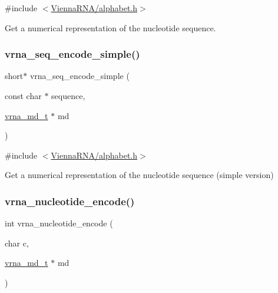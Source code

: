 {\ttfamily \#include $<$\mbox{\hyperlink{alphabet_8h}{Vienna\+R\+N\+A/alphabet.\+h}}$>$}



Get a numerical representation of the nucleotide sequence. 

\mbox{\label{group__alphabet__utils_ga3cd79d21d53248ad2634c1c0d43e97d7}} 
\subsubsection{\texorpdfstring{vrna\_seq\_encode\_simple()}{vrna\_seq\_encode\_simple()}}
{\footnotesize\ttfamily short$\ast$ vrna\+\_\+seq\+\_\+encode\+\_\+simple (\begin{DoxyParamCaption}\item[{const char $\ast$}]{sequence,  }\item[{\mbox{\hyperlink{group__model__details_ga1f8a10e12a0a1915f2a4eff0b28ea17c}{vrna\+\_\+md\+\_\+t}} $\ast$}]{md }\end{DoxyParamCaption})}



{\ttfamily \#include $<$\mbox{\hyperlink{alphabet_8h}{Vienna\+R\+N\+A/alphabet.\+h}}$>$}



Get a numerical representation of the nucleotide sequence (simple version) 

\mbox{\label{group__alphabet__utils_gac12bf00123f88621c9be847b0879c1fb}} 
\subsubsection{\texorpdfstring{vrna\_nucleotide\_encode()}{vrna\_nucleotide\_encode()}}
{\footnotesize\ttfamily int vrna\+\_\+nucleotide\+\_\+encode (\begin{DoxyParamCaption}\item[{char}]{c,  }\item[{\mbox{\hyperlink{group__model__details_ga1f8a10e12a0a1915f2a4eff0b28ea17c}{vrna\+\_\+md\+\_\+t}} $\ast$}]{md }\end{DoxyParamCaption})}



